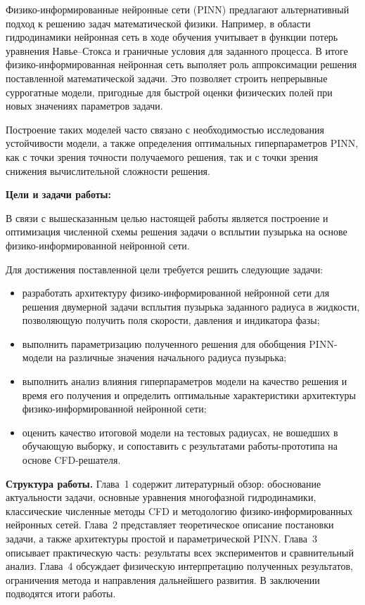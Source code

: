 \documentclass[12pt,a4paper]{article}
\begin{document}
Физико-информированные нейронные сети (PINN) предлагают альтернативный подход к решению задач математической физики. Например, в области гидродинамики 
нейронная сеть в ходе обучения учитывает в функции потерь уравнения Навье--Стокса и граничные условия для заданного процесса. В итоге физико-информированная нейронная сеть выполяет роль аппроксимации решения поставленной математической задачи.  Это позволяет строить
непрерывные суррогатные модели, пригодные для быстрой оценки физических полей
при новых значениях параметров задачи. 

Построение таких моделей часто связано с необходимостью исследования устойчивости модели, а также определения оптимальных гиперпараметров PINN, как с точки зрения точности получаемого решения, так и с точки зрения снижения вычислительной сложности решения.

\medskip
\noindent\textbf{Цели и задачи работы:}

В связи с вышесказанным целью настоящей работы является построение и оптимизация численной схемы решения задачи о всплытии пузырька на основе физико-информированной нейронной сети.

Для достижения поставленной цели требуется решить следующие задачи:

\begin{itemize}
  \item разработать архитектуру физико-информированной нейронной сети для решения двумерной задачи всплытия пузырька заданного радиуса в жидкости, позволяющую получить поля скорости, давления и индикатора фазы;
  \item выполнить параметризацию полученного решения для обобщения PINN-модели на различные
        значения начального радиуса пузырька;
  \item выполнить анализ влияния гиперпараметров модели на качество решения и время его получения и определить оптимальные характеристики архитектуры физико-информированной нейронной сети;
  \item оценить качество итоговой модели на тестовых радиусах, не вошедших в
        обучающую выборку, и сопоставить с результатами работы-прототипа на основе CFD-решателя.
\end{itemize}

\medskip
\noindent\textbf{Структура работы.}
Глава~1 содержит литературный обзор: обоснование актуальности задачи,
основные уравнения многофазной гидродинамики, классические численные методы
CFD и методологию физико-информированных нейронных сетей.
Глава~2 представляет теоретическое описание постановки задачи, а также
архитектуры простой и параметрической PINN.
Глава~3 описывает практическую часть: результаты всех экспериментов и
сравнительный анализ.
Глава~4 обсуждает физическую интерпретацию полученных результатов,
ограничения метода и направления дальнейшего развития.
В заключении подводятся итоги работы.
\end{document}
